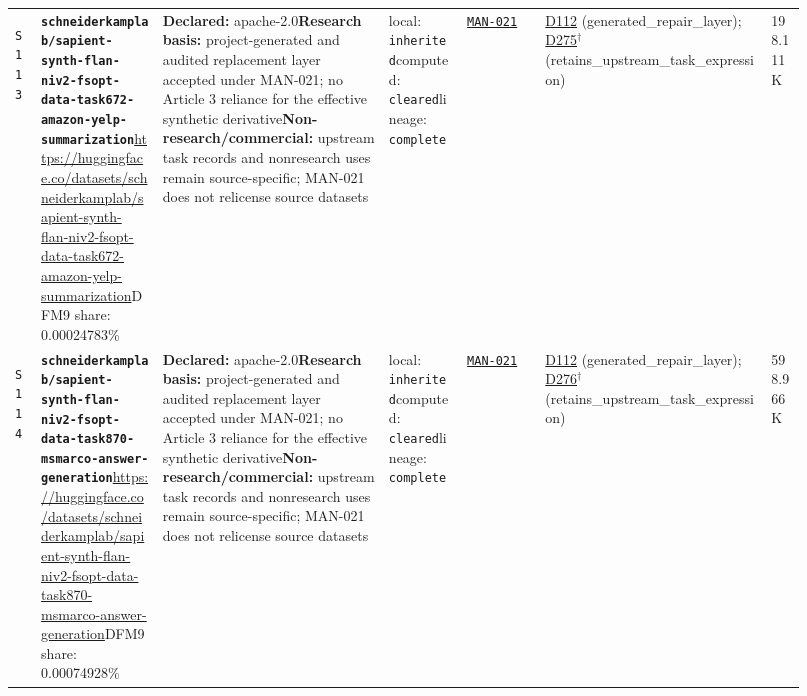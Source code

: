 \documentclass[9pt,a4paper]{article}
\newcommand{\srcid}[1]{\hypertarget{src:#1}{\texttt{#1}}}
\begin{document}
\begin{landscape}
\begin{longtable}{@{}L{0.03\linewidth}L{0.14\linewidth}L{0.26\linewidth}L{0.09\linewidth}L{0.09\linewidth}L{0.265\linewidth}L{0.045\linewidth}@{}}
\srcid{S113} & \textbf{\nolinkurl{schneiderkamplab/sapient-synth-flan-niv2-fsopt-data-task672-amazon-yelp-summarization}}\newline \url{https://huggingface.co/datasets/schneiderkamplab/sapient-synth-flan-niv2-fsopt-data-task672-amazon-yelp-summarization}\newline DFM9 share: 0.00024783\% & \textbf{Declared:} apache-2.0\newline \textbf{Research basis:} project-generated and audited replacement layer accepted under MAN-021; no Article 3 reliance for the effective synthetic derivative\newline \textbf{Non-research/commercial:} upstream task records and nonresearch uses remain source-specific; MAN-021 does not relicense source datasets & local: \texttt{inherited}\newline computed: \texttt{cleared}\newline lineage: \texttt{complete} & \hyperlink{manual:MAN-021}{\texttt{MAN-021}} & \hyperlink{dep:D112}{D112} (generated\_repair\_layer); \hyperlink{dep:D275}{D275}$^{\dagger}$ (retains\_upstream\_task\_expression) & 198.111K \\
\srcid{S114} & \textbf{\nolinkurl{schneiderkamplab/sapient-synth-flan-niv2-fsopt-data-task870-msmarco-answer-generation}}\newline \url{https://huggingface.co/datasets/schneiderkamplab/sapient-synth-flan-niv2-fsopt-data-task870-msmarco-answer-generation}\newline DFM9 share: 0.00074928\% & \textbf{Declared:} apache-2.0\newline \textbf{Research basis:} project-generated and audited replacement layer accepted under MAN-021; no Article 3 reliance for the effective synthetic derivative\newline \textbf{Non-research/commercial:} upstream task records and nonresearch uses remain source-specific; MAN-021 does not relicense source datasets & local: \texttt{inherited}\newline computed: \texttt{cleared}\newline lineage: \texttt{complete} & \hyperlink{manual:MAN-021}{\texttt{MAN-021}} & \hyperlink{dep:D112}{D112} (generated\_repair\_layer); \hyperlink{dep:D276}{D276}$^{\dagger}$ (retains\_upstream\_task\_expression) & 598.966K \\

\end{longtable}
\end{landscape}
\end{document}
